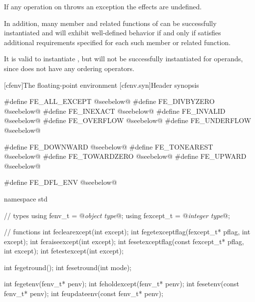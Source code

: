\pnum
If any operation on 
throws an exception the effects are undefined.

\pnum
In addition, many member and related functions of
can be successfully instantiated
and will exhibit well-defined behavior if and only if
 satisfies additional requirements specified for each such member
or related function.

\pnum
\begin{example}
It is valid to instantiate
,
but
will not be successfully instantiated for
operands, since
does not have any ordering operators.
\end{example}

[cfenv]{The floating-point environment}
[cfenv.syn]{Header  synopsis}
%

%
%
%
%
%
%
%
%
%
%
%
%
%
%
%
%
%
%
%
%
%
%
%
%
\begin{codeblock}
#define FE_ALL_EXCEPT @seebelow@
#define FE_DIVBYZERO @seebelow@
#define FE_INEXACT @seebelow@
#define FE_INVALID @seebelow@
#define FE_OVERFLOW @seebelow@
#define FE_UNDERFLOW @seebelow@

#define FE_DOWNWARD @seebelow@
#define FE_TONEAREST @seebelow@
#define FE_TOWARDZERO @seebelow@
#define FE_UPWARD @seebelow@

#define FE_DFL_ENV @seebelow@

namespace std {
  // types
  using fenv_t    = @\textit{object type}@;
  using fexcept_t = @\textit{integer type}@;

  // functions
  int feclearexcept(int except);
  int fegetexceptflag(fexcept_t* pflag, int except);
  int feraiseexcept(int except);
  int fesetexceptflag(const fexcept_t* pflag, int except);
  int fetestexcept(int except);

  int fegetround();
  int fesetround(int mode);

  int fegetenv(fenv_t* penv);
  int feholdexcept(fenv_t* penv);
  int fesetenv(const fenv_t* penv);
  int feupdateenv(const fenv_t* penv);
}
\end{codeblock}

